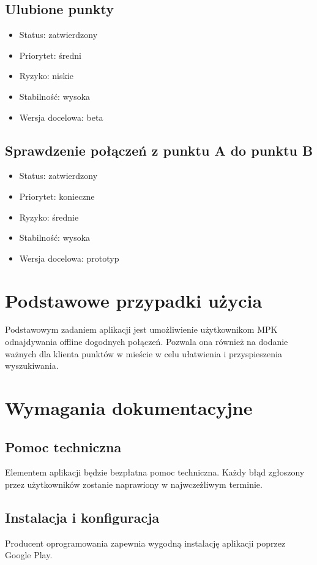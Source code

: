 \documentclass[12pt,a4paper]{article}
\begin{document}
	\subsection{Ulubione punkty}
\begin{itemize}
    \item Status: zatwierdzony
    \item Priorytet: średni
    \item Ryzyko: niskie
    \item Stabilność: wysoka
    \item Wersja docelowa: beta
\end{itemize}

	\subsection{Sprawdzenie połączeń z punktu A do punktu B}
\begin{itemize}
    \item Status: zatwierdzony
    \item Priorytet: konieczne
    \item Ryzyko: średnie
    \item Stabilność: wysoka
    \item Wersja docelowa: prototyp
\end{itemize}

\newpage
	
\section{Podstawowe przypadki użycia}
Podstawowym zadaniem aplikacji jest umożliwienie użytkownikom MPK odnajdywania offline dogodnych połączeń. Pozwala ona również na dodanie ważnych dla klienta punktów w mieście w celu ułatwienia i przyspieszenia wyszukiwania. 
	\newpage
	
\section{Wymagania dokumentacyjne}
\subsection{Pomoc techniczna}
Elementem aplikacji będzie bezpłatna pomoc techniczna. Każdy błąd zgłoszony przez użytkowników zostanie naprawiony w najwczeżliwym terminie.

\subsection{Instalacja i konfiguracja}
Producent oprogramowania zapewnia wygodną instalację aplikacji poprzez Google Play. 
\end{document}

